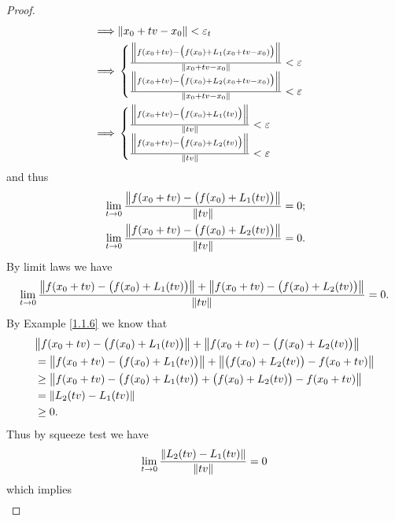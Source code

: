 \begin{proof}
\begin{align*}
        \implies & \norm*{x_0 + tv - x_0} < \varepsilon_t                                                      \\
        \implies & \begin{cases}
            \frac{\norm*{f(x_0 + tv) - \big(f(x_0) + L_1(x_0 + tv - x_0)\big)}}{\norm*{x_0 + tv - x_0}} < \varepsilon \\
            \frac{\norm*{f(x_0 + tv) - \big(f(x_0) + L_2(x_0 + tv - x_0)\big)}}{\norm*{x_0 + tv - x_0}} < \varepsilon
        \end{cases}                                                                  \\
        \implies & \begin{cases}
            \frac{\norm*{f(x_0 + tv) - \big(f(x_0) + L_1(tv)\big)}}{\norm*{tv}} < \varepsilon \\
            \frac{\norm*{f(x_0 + tv) - \big(f(x_0) + L_2(tv)\big)}}{\norm*{tv}} < \varepsilon
        \end{cases}
    \end{align*}
    and thus
    \begin{align*}
         & \lim_{t \to 0} \frac{\norm*{f(x_0 + tv) - \big(f(x_0) + L_1(tv)\big)}}{\norm*{tv}} = 0; \\
         & \lim_{t \to 0} \frac{\norm*{f(x_0 + tv) - \big(f(x_0) + L_2(tv)\big)}}{\norm*{tv}} = 0.
    \end{align*}
    By limit laws we have
    \[
        \lim_{t \to 0} \frac{\norm*{f(x_0 + tv) - \big(f(x_0) + L_1(tv)\big)} + \norm*{f(x_0 + tv) - \big(f(x_0) + L_2(tv)\big)}}{\norm*{tv}} = 0.
    \]
    By Example \ref{1.1.6} we know that
    \begin{align*}
         & \norm*{f(x_0 + tv) - \big(f(x_0) + L_1(tv)\big)} + \norm*{f(x_0 + tv) - \big(f(x_0) + L_2(tv)\big)}   \\
         & = \norm*{f(x_0 + tv) - \big(f(x_0) + L_1(tv)\big)} + \norm*{\big(f(x_0) + L_2(tv)\big) - f(x_0 + tv)} \\
         & \geq \norm*{f(x_0 + tv) - \big(f(x_0) + L_1(tv)\big) + \big(f(x_0) + L_2(tv)\big) - f(x_0 + tv)}      \\
         & = \norm*{L_2(tv) - L_1(tv)}                                                                           \\
         & \geq 0.
    \end{align*}
    Thus by squeeze test we have
    \[
        \lim_{t \to 0} \frac{\norm*{L_2(tv) - L_1(tv)}}{\norm*{tv}} = 0
    \]
    which implies
    \begin{align*}

\end{align*}
\end{proof}
